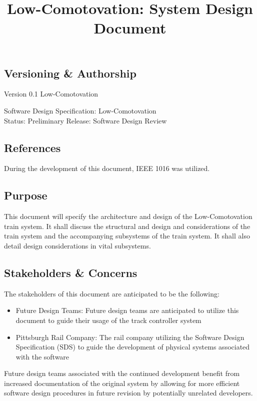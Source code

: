 \documentclass[]{article}
\title{Low-Comotovation: System Design Document}
\author{}
\date{}
\begin{document}
\maketitle
\tableofcontents
\titlepage

\subsection{Versioning \& Authorship}
Version 0.1
\newline
Low-Comotovation \textcopyright

\raggedright
Software Design Specification: Low-Comotovation \\
Status: Preliminary Release: Software Design Review

\subsection{References}
During the development of this document, IEEE 1016 was utilized.

\subsection{Purpose}
This document will specify the architecture and design of the Low-Comotovation train system. It shall discuss the structural and design and considerations of the train system and the accompanying subsystems of the train system. It shall also detail design considerations in vital subsystems.

\subsection{Stakeholders \& Concerns}
The stakeholders of this document are anticipated to be the following:
\begin{itemize}
	\item Future Design Teams: Future design teams are anticipated to utilize this document to guide their usage of the track controller system
	\item Pittsburgh Rail Company: The rail company utilizing the Software Design Specification (SDS) to guide the development of physical systems associated with the software
\end{itemize}

Future design teams associated with the continued development benefit from increased documentation of the original system by allowing for more efficient software design procedures in future revision by potentially unrelated developers.
\end{document}

